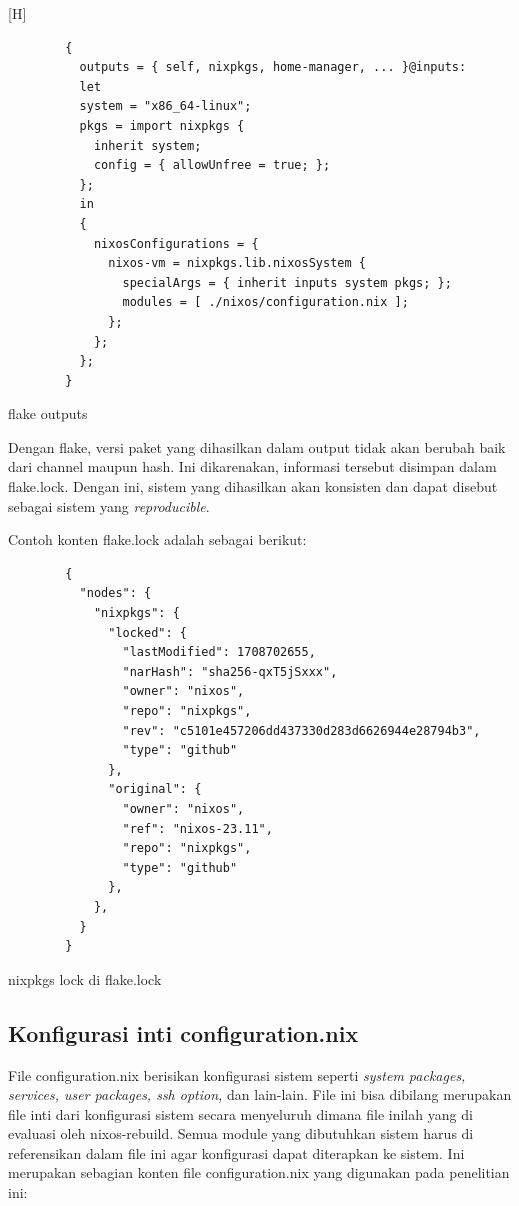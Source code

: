 \documentclass[10pt,]{report}
\newenvironment{code}{\captionsetup{type=listing}}{\vspace{3mm}}
\begin{document}
\begin{adjustwidth}{20pt}{}
\begin{adjustwidth}{20pt}{}
		\begin{code}[H]
			\begin{verbatim}
        {
          outputs = { self, nixpkgs, home-manager, ... }@inputs:
          let
          system = "x86_64-linux";
          pkgs = import nixpkgs {
            inherit system;
            config = { allowUnfree = true; };
          };
          in
          {
            nixosConfigurations = {
              nixos-vm = nixpkgs.lib.nixosSystem {
                specialArgs = { inherit inputs system pkgs; };
                modules = [ ./nixos/configuration.nix ];
              };
            };
          };
        }
      \end{verbatim}
			\caption{flake outputs}
		\end{code}

		Dengan flake, versi paket yang dihasilkan dalam output tidak akan berubah
		baik dari channel maupun hash. Ini dikarenakan, informasi tersebut disimpan
		dalam flake.lock. Dengan ini, sistem yang dihasilkan akan konsisten dan
		dapat disebut sebagai sistem yang \textit{reproducible}.

		Contoh konten flake.lock adalah sebagai berikut:

		\begin{code}
			\begin{verbatim}
        {
          "nodes": {
            "nixpkgs": {
              "locked": {
                "lastModified": 1708702655,
                "narHash": "sha256-qxT5jSxxx",
                "owner": "nixos",
                "repo": "nixpkgs",
                "rev": "c5101e457206dd437330d283d6626944e28794b3",
                "type": "github"
              },
              "original": {
                "owner": "nixos",
                "ref": "nixos-23.11",
                "repo": "nixpkgs",
                "type": "github"
              },
            },
          }
        }
      \end{verbatim}
			\caption{nixpkgs lock di flake.lock}
		\end{code}

	\end{adjustwidth}
	\subsection{Konfigurasi inti configuration.nix}
	\vspace{-3mm}
	\begin{adjustwidth}{20pt}{}
		File configuration.nix berisikan konfigurasi sistem seperti \textit{system
			packages, services, user packages, ssh option, }dan lain-lain. File ini
		bisa dibilang merupakan file inti dari konfigurasi sistem secara menyeluruh
		dimana file inilah yang di evaluasi oleh nixos-rebuild. Semua module yang
		dibutuhkan sistem harus di referensikan dalam file ini agar konfigurasi
		dapat diterapkan ke sistem.
		Ini merupakan sebagian konten file configuration.nix yang digunakan pada
		penelitian ini:


\end{adjustwidth}
\end{adjustwidth}
\end{document}
